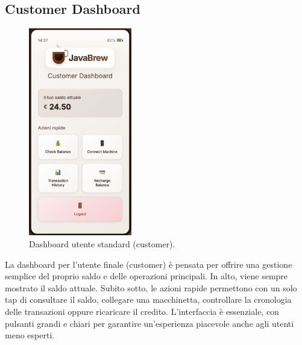 \subsection{Customer Dashboard}
\begin{figure}[H]
    \centering
    \includegraphics[width=0.4\textwidth]{./assets/customer.png}
    \caption{Dashboard utente standard (customer).}
\end{figure}
La dashboard per l’utente finale (customer) è pensata per offrire una gestione semplice del proprio saldo e delle operazioni principali. In alto, viene sempre mostrato il saldo attuale. Subito sotto, le azioni rapide permettono con un solo tap di consultare il saldo, collegare una macchinetta, controllare la cronologia delle transazioni oppure ricaricare il credito. L’interfaccia è essenziale, con pulsanti grandi e chiari per garantire un’esperienza piacevole anche agli utenti meno esperti.

